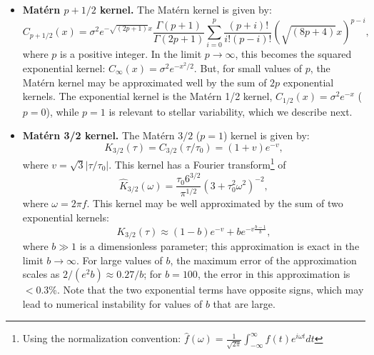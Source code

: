 \documentclass[manuscript, letterpaper]{aastex6}
\begin{document}
\begin{itemize}
\item {\bf Mat\'ern $p+1/2$ kernel.}  The Mat\'ern kernel is given by:
\begin{equation}
C_{p+1/2}(x) = \sigma^2 e^{-\sqrt{(2p+1)}x} \frac{\Gamma(p+1)}{\Gamma(2p+1)}
\sum_{i=0}^p \frac{(p+i)!}{i!(p-i)!} (\sqrt{(8p+4)}x)^{p-i},
\end{equation}
where $p$ is a positive integer.  In the limit $p\rightarrow \infty$, this becomes the
squared exponential kernel: $C_\infty(x) = \sigma^2 e^{-x^2/2}$.  But, for small
values of $p$, the Mat\'ern kernel may be approximated well by the sum of
$2p$ exponential kernels.  The exponential kernel is the Mat\'ern 1/2 kernel,
$C_{1/2}(x) = \sigma^2 e^{-x}$ ($p=0$), while
$p=1$ is relevant to stellar variability, which we describe next.
\item {\bf Mat\'ern 3/2 kernel.}  The Mat\'ern $3/2$ ($p=1$) kernel is given by:
\begin{equation}
K_{3/2}(\tau) = C_{3/2}(\tau/\tau_0) = (1+v)e^{-v},
\end{equation}
where $v = \sqrt{3}\vert \tau/\tau_0\vert$.  This kernel has a Fourier transform\footnote{Using the normalization convention:
$\hat f(\omega) = \frac{1}{\sqrt{2\pi}} \int_{-\infty}^\infty f(t) e^{i\omega t} dt$}  of
\begin{equation}
\hat K_{3/2}(\omega) = \frac{\tau_0 6^{3/2}}{\pi^{1/2}} (3+\tau_0^2\omega^2)^{-2},
\end{equation}
where $\omega = 2\pi f$.  This kernel may be well approximated by the sum of two exponential kernels:
\begin{equation}
K_{3/2}(\tau) \approx (1-b)e^{-v}+be^{-v\frac{b-1}{b}},
\end{equation}
where $b \gg 1$ is a dimensionless parameter; this approximation is exact in the limit $b \rightarrow \infty$.  For
large values of $b$, the maximum error of the approximation scales as $2/(e^2b) \approx 0.27/b$; for
$b=100$, the error in this approximation is $<0.3$\%.  Note that the two exponential terms
have opposite signs, which may lead to numerical instability for values of $b$ that
are large.


\end{itemize}
\end{document}
